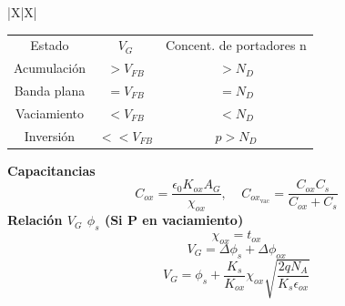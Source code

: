 \documentclass[../main.tex]{subfiles}
\begin{document}
\begin{xltabular}{\textwidth}{|X|X|}
	\\
	\begin{center}
		\begin{tabular}{|c|c|c|}
			\firsthline
			\multicolumn{3}{| c |}{\textbf{Para sustrato N}}
			\\
			\hline
			Estado      & $V_G$       & Concent. de portadores n \\
			\hline
			Acumulación & $> V_{FB}$  & $>N_D$                   \\
			Banda plana & $= V_{FB}$  & $=N_D$                   \\
			Vaciamiento & $< V_{FB}$  & $< N_D$                  \\
			Inversión   & $<< V_{FB}$ & $p > N_D$                \\
			\hline
		\end{tabular}\newline\newline\end{center}
	\textbf{Capacitancias}
	$$C_{ox} = \frac{\epsilon_0K_{ox}A_G}{\chi_{ox}}, ~~~~~ C_{ox_{\text{vac}}} =  \frac{C_{ox} C_s}{C_{ox} + C_s}$$
	\textbf{Relación $V_G$ $\phi_s$ (Si P en vaciamiento)}
	$$\chi_{ox} = t_{ox}$$
	$$V_G = \Delta\phi_s + \Delta\phi_{ox}$$
	$$V_G = \phi_s + \frac{K_s}{K_{ox}}\chi_{ox}\sqrt{\frac{2qN_A}{K_s\epsilon_{ox}}}$$


\end{xltabular}
\end{document}

